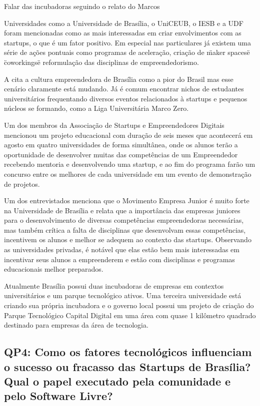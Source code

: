 Falar das incubadoras seguindo o relato do Marcos

Universidades como a Universidade de Brasília, o UniCEUB, o IESB e a UDF foram mencionadas como as mais interessadas em criar envolvimentos com as startups, o que é um fator positivo. Em especial nas particulares já existem uma série de ações pontuais como programas de aceleração, criação de \"maker spaces\" e \"coworkings\" e reformulação das disciplinas de empreendedorismo.

A  cita a cultura empreendedora de Brasília como a pior do Brasil mas esse cenário claramente está mudando. Já é comum encontrar nichos de estudantes universitários frequentando diversos eventos relacionados à startups e pequenos núcleos se formando, como a Liga Universitária Marco Zero. 

Um dos membros da Associação de Startups e Empreendedores Digitais mencionou um projeto educacional com duração de seis meses que acontecerá em agosto em quatro universidades de forma simultânea, onde os alunos terão a oportunidade de desenvolver muitas das competências de um Empreendedor recebendo mentoria e desenvolvendo uma startup, e ao fim do programa farão um concurso entre os melhores de cada universidade em um evento de demonstração de projetos.

Um dos entrevistados menciona que o Movimento Empresa Junior é muito forte na Universidade de Brasília e relata que a importância das empresas juniores para o desenvolvimento de diversas competências empreendedoras necessárias, mas também crítica a falta de disciplinas que desenvolvam essas competências, incentivem os alunos e melhor se adequem ao contexto das startups. Observando as universidades privadas, é notável que elas estão bem mais interessadas em incentivar seus alunos a empreenderem e estão com disciplinas e programas educacionais melhor preparados.

Atualmente Brasília possui duas incubadoras de empresas em contextos universitários e um parque tecnológico ativos. Uma terceira universidade está criando sua própria incubadora e o governo local possui um projeto de criação do Parque Tecnológico Capital Digital em uma área com quase 1 kilômetro quadrado destinado para empresas da área de tecnologia.

\subsection{QP4: Como os fatores tecnológicos influenciam o sucesso ou fracasso das Startups de Brasília? Qual o papel executado pela comunidade e pelo Software Livre?}
\label{subsection:pergunta_de_pesquisa_4}

